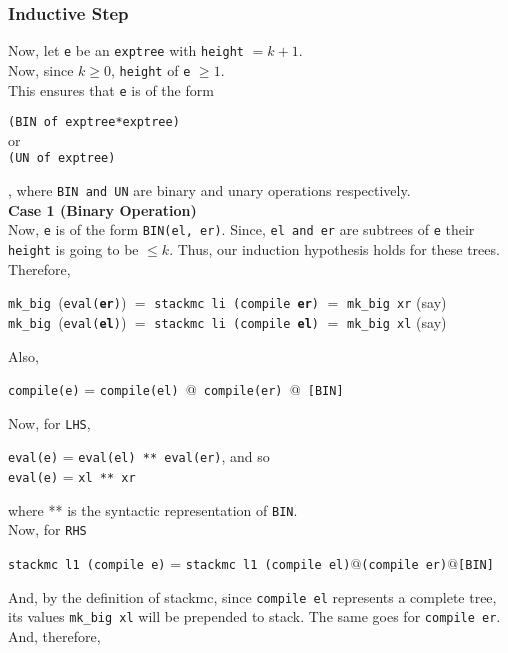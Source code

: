 \documentclass{article}
\begin{document}
\subsubsection*{Inductive Step}
Now, let \texttt{e} be an \texttt{exptree} with \texttt{height} \(= k+1 \).\\[5pt]Now, since  \( k \geq 0\), \texttt{height} of \texttt{e} \( \geq 1\).\\[5pt] This ensures that \texttt{e} is of the form 
\begin{center}
    \texttt{(BIN of exptree*exptree)}\\ or \\\texttt{(UN of exptree)}
\end{center} 
, where \texttt{BIN and UN} are binary and unary operations respectively. \\[10 pt]
\textbf{Case 1 (Binary Operation)} \\ [5 pt]
    Now, \texttt{e} is of the form \texttt{BIN(el, er)}. Since, \texttt{el and er} are subtrees of \texttt{e} their \texttt{height} is going to be \( \leq k\). Thus, our induction hypothesis holds for these trees. Therefore,
    \begin{center}
        \texttt{mk\_big }(\texttt{eval(\textbf{er})}) \(=\) \texttt{stackmc li (compile \textbf{er})} \(=\) \texttt{mk\_big xr} (say) \\
        \texttt{mk\_big }(\texttt{eval(\textbf{el})}) \(=\) \texttt{stackmc li (compile \textbf{el})} \(=\) \texttt{mk\_big xl} (say)
    \end{center}
    Also,
    \begin{center}
        \texttt{compile(e)} = \texttt{compile(el) $@$ compile(er) $@$ [BIN]}   
    \end{center}
    Now, for \texttt{LHS}, 
    \begin{center}
        \texttt{eval(e)} = \texttt{eval(el) ** eval(er)}, and so \\
        \texttt{eval(e)} = \texttt{xl ** xr}                            
    \end{center}
    where ** is the syntactic representation of \texttt{BIN}. \\[5pt]
    Now, for \texttt{RHS} 
    \begin{center}
        {\small \texttt{stackmc l1 (compile e)} = \texttt{stackmc l1 (compile el)$@$(compile er)$@$[BIN]}}
    \end{center}
    And, by the definition of stackmc, since \texttt{compile el} represents a complete tree, its values \texttt{mk\_big xl} will be prepended to stack. The same goes for \texttt{compile er}. And, therefore,
\end{document}
